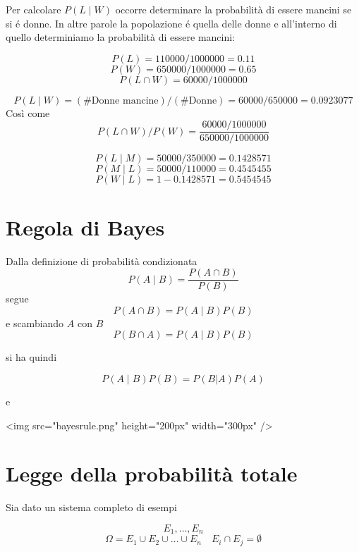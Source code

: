 \documentclass[onecolumn,12pt]{book}\usepackage[]{graphicx}\usepackage[]{color}
\begin{document}
Per calcolare $P(L \mid  W)$  occorre determinare la probabilità di essere mancini se si é donne. In altre parole la popolazione é quella delle donne e all'interno di quello determiniamo  la probabilità di essere mancini:


$$P(L) = 110000/1000000=0.11$$
$$P(W)= 650000/1000000=0.65$$
$$P(L \cap  W) = 60000/1000000$$

$$P (L \mid W)=(\# \textrm{Donne mancine})/(\# \textrm{Donne})=60000/650000=0.0923077$$
Così come
$$P(L\cap W)/P(W)=\dfrac{60000/1000000}{650000/1000000}$$

 $$P (L \mid M)=50000/350000=0.1428571$$
 $$P (M \mid L)=50000/110000=0.4545455$$
 $$P (W \mid L)=1-0.1428571=0.5454545$$

\section{Regola di Bayes}



Dalla  definizione di probabilità condizionata
$$P(A \mid B)=\dfrac{P(A \cap  B)}{P(B)}$$  segue
$$P(A \cap B)=P(A \mid  B) P(B)$$  e scambiando $A$ con $B$
$$P(B \cap A)=P(A \mid  B) P(B)$$
 
si ha quindi
 
$$P(A \mid  B)P(B) = P(B | A) P(A)$$

e

<img src="bayesrule.png" height="200px" width="300px" />

 
\section{Legge della probabilità totale}

Sia dato un sistema completo di esempi 

$$E_1,\ldots,E_n$$
$$\Omega=E_1\cup E_2\cup\ldots\cup E_n\quad E_i\cap E_j=\emptyset$$
\end{document}
